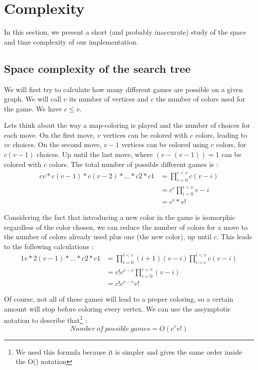 \section{Complexity}

In this section, we present a short (and probably inaccurate) study of the space and time complexity of our implementation.

\subsection{Space complexity of the search tree}

We will first try to calculate how many different games are possible on a given graph. We will call $v$ its number of vertices and $c$ the number of colors used for the game. We have $c\leq v$.

Lets think about the way a map-coloring is played and the number of choices for each move. On the first move, $v$ vertices can be colored with $c$ colors, leading to $vc$ choices. On the second move, $v-1$ vertices can be colored using $c$ colors, for $c(v-1)$ choices. Up until the last move, where $(v-(v-1))=1$ can be colored with $c$ colors. The total number of possible different games is :
\begin{align*}
cv*c(v-1)*c(v-2)*...*c2*c1 &=
\prod_{i=0}^{i<v}c(v-i)\\  &=
c^v \prod_{i=0}^{i<v}v-i \\ &= c^v*v!
\end{align*}

Considering the fact that introducing a new color in the game is isomorphic regardless of the color chosen, we can reduce the number of colors for a move to the number of colors already used plus one (the new color), up until $c$. This leads to the following calculations :
\begin{align*}
1v*2(v-1)*...*c2*c1 &= \prod_{i=0}^{i<c} (i+1)(v-i) \prod_{i=c}^{i<v} c(v-i)\\
&= c!c^{v-c} \prod_{i=0}^{i<v}(v-i)\\
 &= c!c^{v-c}v!
\end{align*}

Of course, not all of these games will lead to a proper coloring, so a certain amount will stop before coloring every vertex. We can use the assymptotic notation to describe that\footnote{We used this formula because it is simpler and gives the same order inside the O() notation} :
\[
Number\ of\ possible\ games = O(c^vv!)
\]


